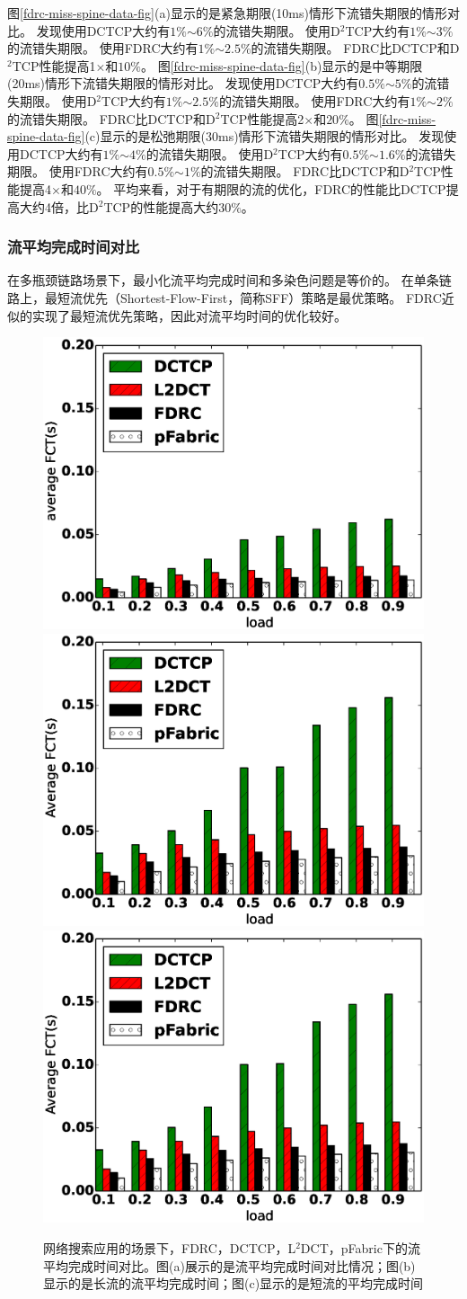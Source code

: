 图\ref{fdrc-miss-spine-data-fig}(a)显示的是紧急期限(10ms)情形下流错失期限的情形对比。
发现使用DCTCP大约有$1\%$$\sim$$6\%$的流错失期限。
使用D$^2$TCP大约有$1\%$$\sim$$3\%$的流错失期限。
使用FDRC大约有$1\%$$\sim$$2.5\%$的流错失期限。
FDRC比DCTCP和D$^2$TCP性能提高1$\times$和$10\%$。
图\ref{fdrc-miss-spine-data-fig}(b)显示的是中等期限(20ms)情形下流错失期限的情形对比。
发现使用DCTCP大约有$0.5\%$$\sim$$5\%$的流错失期限。
使用D$^2$TCP大约有$1\%$$\sim$$2.5\%$的流错失期限。
使用FDRC大约有$1\%$$\sim$$2\%$的流错失期限。
FDRC比DCTCP和D$^2$TCP性能提高2$\times$和$20\%$。
图\ref{fdrc-miss-spine-data-fig}(c)显示的是松弛期限(30ms)情形下流错失期限的情形对比。
发现使用DCTCP大约有$1\%$$\sim$$4\%$的流错失期限。
使用D$^2$TCP大约有$0.5\%$$\sim$$1.6\%$的流错失期限。
使用FDRC大约有$0.5\%$$\sim$$1\%$的流错失期限。
FDRC比DCTCP和D$^2$TCP性能提高4$\times$和$40\%$。
平均来看，对于有期限的流的优化，FDRC的性能比DCTCP提高大约4倍，比D$^2$TCP的性能提高大约$30\%$。




\subsubsection{流平均完成时间对比}
在多瓶颈链路场景下，最小化流平均完成时间和多染色问题是等价的\cite{COLOR}。
在单条链路上，最短流优先（Shortest-Flow-First，简称SFF）策略是最优策略。
FDRC近似的实现了最短流优先策略，因此对流平均时间的优化较好。


\begin{figure}[h]
\centering
{}
 {\includegraphics[width=0.32\columnwidth]{figures/FDRC/evaluation/spineleaf/FCT_SEARCH_average.eps}}
{\includegraphics[width=0.32\columnwidth]{figures/FDRC/evaluation/spineleaf/FCT_SEARCH_large.eps}}
{\includegraphics[width=0.32\columnwidth]{figures/FDRC/evaluation/spineleaf/FCT_SEARCH_large.eps}}
\caption{网络搜索应用的场景下，FDRC，DCTCP，L$^2$DCT，pFabric下的流平均完成时间对比。图(a)展示的是流平均完成时间对比情况；图(b)显示的是长流的流平均完成时间；图(c)显示的是短流的平均完成时间}
\label{fdrc-fct-spine-search-5-fig}
\end{figure}


